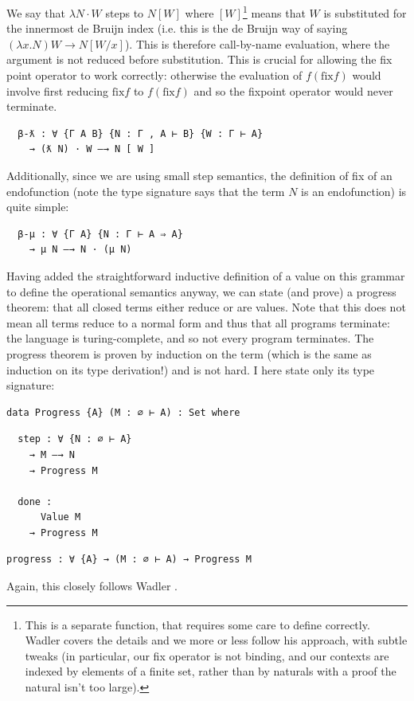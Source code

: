 \documentclass[12pt,a4paper,twoside,openright]{report}
\begin{document}
We say that $\lambda N \cdot W$ steps to $N [W]$ where $[W]$\footnote{This is a separate function, that requires some care to define correctly. Wadler \cite{PLFA} covers the details and we more or less follow his approach, with subtle tweaks (in particular, our fix operator is not binding, and our contexts are indexed by elements of a finite set, rather than by naturals with a proof the natural isn't too large).} means that $W$ is substituted for the innermost de Bruijn index (i.e. this is the de Bruijn way of saying $(\lambda x. N) W \to N[W/x]$). This is therefore call-by-name evaluation, where the argument is not reduced before substitution. This is crucial for allowing the fix point operator to work correctly: otherwise the evaluation of $f (\text{fix} f)$ would involve first reducing $\text{fix} f$ to $f (\text{fix} f)$ and so the fixpoint operator would never terminate. 
\begin{verbatim}
  β-ƛ : ∀ {Γ A B} {N : Γ , A ⊢ B} {W : Γ ⊢ A}
    → (ƛ N) · W —→ N [ W ]
\end{verbatim}
Additionally, since we are using small step semantics, the definition of fix of an endofunction (note the type signature says that the term $N$ is an endofunction) is quite simple:
\begin{verbatim}
  β-μ : ∀ {Γ A} {N : Γ ⊢ A ⇒ A}
    → μ N —→ N · (μ N)
\end{verbatim}

Having added the straightforward inductive definition of a value on this grammar to define the operational semantics anyway, we can state (and prove) a progress theorem: that all closed terms either reduce or are values. Note that this does not mean all terms reduce to a normal form and thus that all programs terminate: the language is turing-complete, and so not every program terminates. The progress theorem is proven by induction on the term (which is the same as induction on its type derivation!) and is not hard. I here state only its type signature:
\begin{verbatim}
data Progress {A} (M : ∅ ⊢ A) : Set where
\end{verbatim}
\begin{multicols}{2}
\begin{verbatim}
  step : ∀ {N : ∅ ⊢ A}
    → M —→ N
    → Progress M

  done :
      Value M
    → Progress M
\end{verbatim}
\end{multicols}
\begin{verbatim}
progress : ∀ {A} → (M : ∅ ⊢ A) → Progress M
\end{verbatim}
Again, this closely follows Wadler \cite{PLFA}. 
\end{document}
